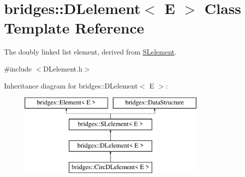 \hypertarget{classbridges_1_1_d_lelement}{}\section{bridges\+:\+:D\+Lelement$<$ E $>$ Class Template Reference}
\label{classbridges_1_1_d_lelement}


The doubly linked list element, derived from \mbox{\hyperlink{classbridges_1_1_s_lelement}{S\+Lelement}}.  




{\ttfamily \#include $<$D\+Lelement.\+h$>$}

Inheritance diagram for bridges\+:\+:D\+Lelement$<$ E $>$\+:\begin{figure}[H]
\begin{center}
\leavevmode
\includegraphics[height=4.000000cm]{classbridges_1_1_d_lelement}
\end{center}
\end{figure}
